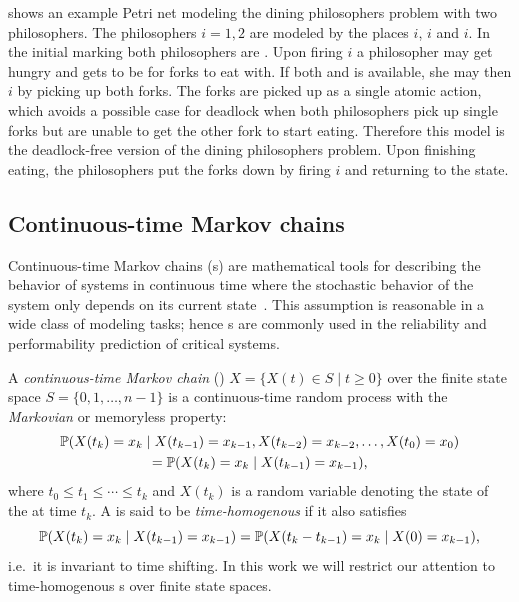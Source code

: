 \begin{runningExample}\label{ex:background:pn}
   shows an example Petri net modeling the dining philosophers problem with two philosophers. The philosophers \(i = 1, 2\) are modeled by the places \(i\), \(i\) and \(i\). In the initial marking both philosophers are . Upon firing \(i\) a philosopher may get hungry and gets to be  for forks to eat with. If both  and  is available, she may then \(i\) by picking up both forks. The forks are picked up as a single atomic action, which avoids a possible case for deadlock when both philosophers pick up single forks but are unable to get the other fork to start eating. Therefore this model is the deadlock-free version of the dining philosophers problem. Upon finishing eating, the philosophers put the forks down by firing \(i\) and returning to the  state.
\end{runningExample}

\subsection{Continuous-time Markov chains}
\label{ssec:background:ctmc}

Continuous-time Markov chains (s) are mathematical tools for describing the behavior of systems in continuous time where the stochastic behavior of the system only depends on its current state~. This assumption is reasonable in a wide class of modeling tasks; hence s are commonly used in the reliability and performability prediction of critical systems.

\begin{dfn}
  A \emph{continuous-time Markov chain} ()
  \(X = \{ X(t) \in S \mid t \ge 0 \}\) over the finite state
  space $S = \{0, 1, \ldots, n - 1\}$ is a continuous-time random
  process with the \emph{Markovian} or memoryless property:
  \begin{multline}\allowdisplaybreaks[0]
    \Pr(X(t_k) = x_k \mid X(t_{k - 1}) = x_{k - 1}, X(t_{k -
      2}) = x_{k - 2}, \ldots, X(t_{0}) = x_{0}) \\
    = \Pr(X(t_k) = x_k \mid X(t_{k - 1}) = x_{k - 1}) \text,
  \end{multline}
  where $t_0 \le t_1 \le \cdots \le t_k$ and $X(t_k)$ is a random variable denoting the state of the  at time $t_k$. A  is said to be
  \emph{time-homogenous} if it also satisfies
  \begin{equation}
    \Pr(X(t_k) = x_k \mid X(t_{k - 1}) = x_{k - 1}) = \Pr(X(t_k - t_{k -
      1}) = x_k \mid X(0) = x_{k - 1}) \text,
  \end{equation}
  i.e.~it is invariant to time shifting. In this work we will restrict our attention to time-homogenous s over finite state spaces.
\end{dfn}

